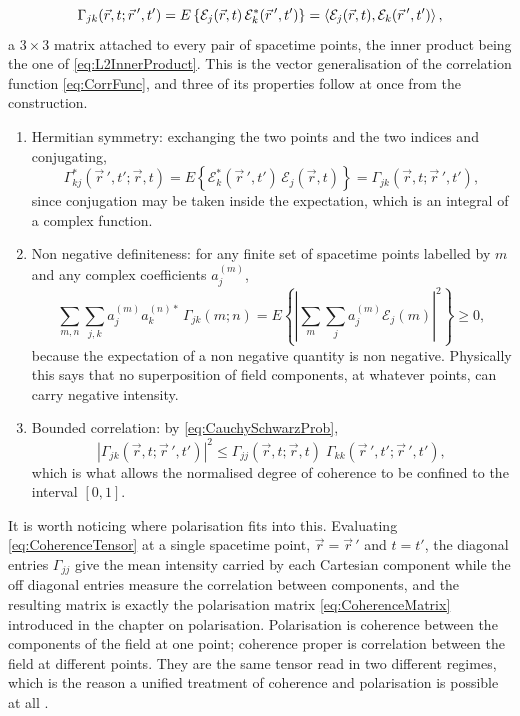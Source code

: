 		\begin{equation}\label{eq:CoherenceTensor}
			\Gamma_{jk}(\vec{r},t;\vec{r}\,',t') = E\left\{\mathcal{E}_{j}(\vec{r},t)\,\mathcal{E}_{k}^{*}(\vec{r}\,',t')\right\}
			= \braket{\mathcal{E}_{j}(\vec{r},t),\mathcal{E}_{k}(\vec{r}\,',t')},
		\end{equation}
		a $3\times3$ matrix attached to every pair of spacetime points, the inner product being
		the one of \eqref{eq:L2InnerProduct}. This is the vector generalisation of the
		correlation function \eqref{eq:CorrFunc}, and three of its properties follow at once
		from the construction.

		\begin{enumerate}
			\item Hermitian symmetry: exchanging the two points and the two indices and
			conjugating,
			\begin{equation}\label{eq:GammaHermitian}
				\Gamma_{kj}^{*}(\vec{r}\,',t';\vec{r},t) = E\left\{\mathcal{E}_{k}^{*}(\vec{r}\,',t')\,\mathcal{E}_{j}(\vec{r},t)\right\} = \Gamma_{jk}(\vec{r},t;\vec{r}\,',t'),
			\end{equation}
			since conjugation may be taken inside the expectation, which is an integral of a
			complex function.
			\item Non negative definiteness: for any finite set of spacetime points
			labelled by $m$ and any complex coefficients $a_{j}^{(m)}$,
			\begin{equation}\label{eq:GammaPositive}
				\sum_{m,n}\sum_{j,k}a_{j}^{(m)}a_{k}^{(n)*}\,\Gamma_{jk}(m;n)
				= E\left\{\left|\sum_{m}\sum_{j}a_{j}^{(m)}\mathcal{E}_{j}(m)\right|^{2}\right\}\geq 0,
			\end{equation}
			because the expectation of a non negative quantity is non negative. Physically this
			says that no superposition of field components, at whatever points, can carry
			negative intensity.
			\item Bounded correlation: by \eqref{eq:CauchySchwarzProb},
			\begin{equation}\label{eq:GammaBound}
				\left|\Gamma_{jk}(\vec{r},t;\vec{r}\,',t')\right|^{2} \leq \Gamma_{jj}(\vec{r},t;\vec{r},t)\;\Gamma_{kk}(\vec{r}\,',t';\vec{r}\,',t'),
			\end{equation}
			which is what allows the normalised degree of coherence to be confined to the
			interval $[0,1]$.
		\end{enumerate}

		It is worth noticing where polarisation fits into this. Evaluating \eqref{eq:CoherenceTensor} at a single spacetime point,
		$\vec{r}=\vec{r}\,'$ and $t=t'$, the diagonal entries $\Gamma_{jj}$ give the mean
		intensity carried by each Cartesian component while the off diagonal entries measure the
		correlation between components, and the resulting matrix is exactly the polarisation
		matrix \eqref{eq:CoherenceMatrix} introduced in the chapter on polarisation.
		Polarisation is coherence between the components of the field at one point;
		coherence proper is correlation between the field at different points. They are the
		same tensor read in two different regimes, which is the reason a unified treatment of
		coherence and polarisation is possible at all \citep{wolf2007introduction}.

